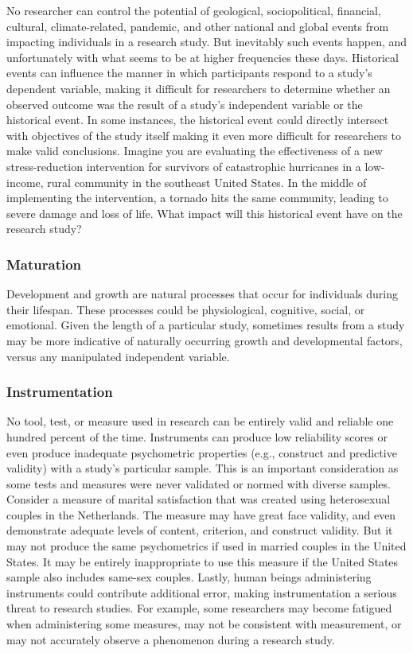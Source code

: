 \documentclass[
  11pt,
]{book}
\begin{document}
No researcher can control the potential of geological, sociopolitical, financial, cultural, climate-related, pandemic, and other national and global events from impacting individuals in a research study. But inevitably such events happen, and unfortunately with what seems to be at higher frequencies these days. Historical events can influence the manner in which participants respond to a study's dependent variable, making it difficult for researchers to determine whether an observed outcome was the result of a study's independent variable or the historical event. In some instances, the historical event could directly intersect with objectives of the study itself making it even more difficult for researchers to make valid conclusions. Imagine you are evaluating the effectiveness of a new stress-reduction intervention for survivors of catastrophic hurricanes in a low-income, rural community in the southeast United States. In the middle of implementing the intervention, a tornado hits the same community, leading to severe damage and loss of life. What impact will this historical event have on the research study?

\subsubsection{Maturation}\label{maturation}

Development and growth are natural processes that occur for individuals during their lifespan. These processes could be physiological, cognitive, social, or emotional. Given the length of a particular study, sometimes results from a study may be more indicative of naturally occurring growth and developmental factors, versus any manipulated independent variable.

\subsubsection{Instrumentation}\label{instrumentation}

No tool, test, or measure used in research can be entirely valid and reliable one hundred percent of the time. Instruments can produce low reliability scores or even produce inadequate psychometric properties (e.g., construct and predictive validity) with a study's particular sample. This is an important consideration as some tests and measures were never validated or normed with diverse samples. Consider a measure of marital satisfaction that was created using heterosexual couples in the Netherlands. The measure may have great face validity, and even demonstrate adequate levels of content, criterion, and construct validity. But it may not produce the same psychometrics if used in married couples in the United States. It may be entirely inappropriate to use this measure if the United States sample also includes same-sex couples. Lastly, human beings administering instruments could contribute additional error, making instrumentation a serious threat to research studies. For example, some researchers may become fatigued when administering some measures, may not be consistent with measurement, or may not accurately observe a phenomenon during a research study.
\end{document}
